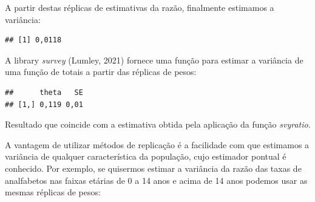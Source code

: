 \documentclass[
  12pt,
  brazilian,
]{book}
\newenvironment{Shaded}{\begin{snugshade}}{\end{snugshade}}
\newcommand{\ControlFlowTok}[1]{\textcolor[rgb]{0.13,0.29,0.53}{\textbf{#1}}}
\newcommand{\DecValTok}[1]{\textcolor[rgb]{0.00,0.00,0.81}{#1}}
\newcommand{\FunctionTok}[1]{\textcolor[rgb]{0.00,0.00,0.00}{#1}}
\newcommand{\NormalTok}[1]{#1}
\newcommand{\OtherTok}[1]{\textcolor[rgb]{0.56,0.35,0.01}{#1}}
\newcommand{\SpecialCharTok}[1]{\textcolor[rgb]{0.00,0.00,0.00}{#1}}
\theoremstyle{definition}
\theoremstyle{definition}
\theoremstyle{definition}
\theoremstyle{definition}
\theoremstyle{remark}
\begin{document}
A partir destas réplicas de estimativas da razão, finalmente estimamos a variância:

\begin{Shaded}
\end{Shaded}

\begin{verbatim}
## [1] 0,0118
\end{verbatim}

A library \emph{survey} (Lumley, 2021) fornece uma função para estimar a variância de uma função de totais a partir das réplicas de pesos:

\begin{Shaded}
\end{Shaded}

\begin{verbatim}
##      theta   SE
## [1,] 0,119 0,01
\end{verbatim}

Resultado que coincide com a estimativa obtida pela aplicação da função \emph{svyratio}.

A vantagem de utilizar métodos de replicação é a facilidade com que estimamos a variância de qualquer
característica da população, cujo estimador pontual é conhecido. Por exemplo, se quisermos estimar a variância da razão das taxas de analfabetos nas faixas etárias de 0 a 14 anos e acima de 14 anos podemos usar as mesmas réplicas de pesos:
\end{document}
